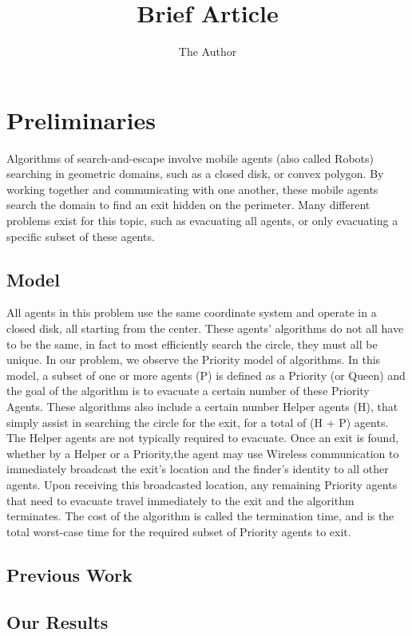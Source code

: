 \documentclass[11pt]{amsart}
\title{Brief Article}
\author{The Author}
\begin{document}
\maketitle
\section{Preliminaries}

Algorithms of search-and-escape involve mobile agents (also called Robots)
searching in geometric domains, such as a closed disk, or convex polygon. By
working together and communicating with one another, these mobile agents search
the domain to find an exit hidden on the perimeter. Many different problems exist for
this topic, such as evacuating all agents, or only evacuating a specific subset of these
agents.

\subsection{Model}

All agents in this problem use the same coordinate system and operate in a closed
disk, all starting from the center. These agents' algorithms do not all have to be the same,
in fact to most efficiently search the circle, they must all be unique.
In our problem, we observe the Priority model of algorithms. In this model, a
subset of one or more agents (P) is defined as a Priority (or Queen) and the goal
of the algorithm is to evacuate a certain number of these Priority Agents. These
algorithms also include a certain number Helper agents (H), that simply assist in searching the circle
for the exit, for a total of (H + P) agents. The Helper agents are not typically required to evacuate.
Once an exit is found, whether by a Helper or a Priority,the agent may use
Wireless communication to immediately broadcast the exit's location and the finder's identity to all other agents.
Upon receiving this broadcasted location, any remaining Priority agents that
need to evacuate travel immediately to the exit and the algorithm terminates.
The cost of the algorithm is called the termination time, and is the total worst-case
time for the required subset of Priority agents to exit.

\subsection{Previous Work}



\subsection{Our Results}
\end{document}
